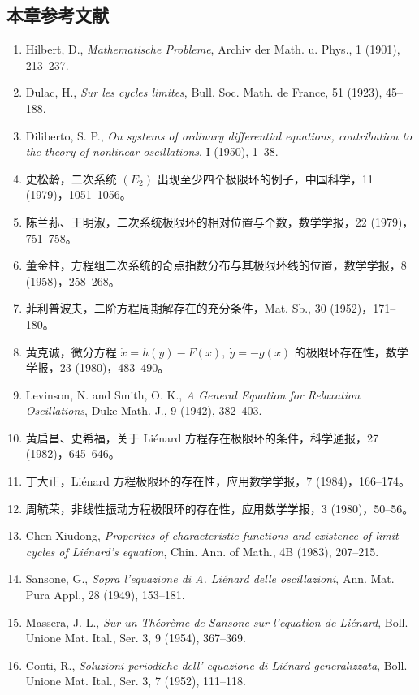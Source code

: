 \subsection*{本章参考文献}
\begin{enumerate}
\item Hilbert, D., \emph{Mathematische Probleme}, Archiv der Math. u. Phys., 1 (1901), 213--237.
\item Dulac, H., \emph{Sur les cycles limites}, Bull. Soc. Math. de France, 51 (1923), 45--188.
\item Diliberto, S. P., \emph{On systems of ordinary differential equations, contribution to the theory of nonlinear oscillations}, I (1950), 1--38.
\item 史松龄，二次系统 $(E_2)$ 出现至少四个极限环的例子，中国科学，11 (1979)，1051--1056。
\item 陈兰荪、王明淑，二次系统极限环的相对位置与个数，数学学报，22 (1979)，751--758。
\item 董金柱，方程组二次系统的奇点指数分布与其极限环线的位置，数学学报，8 (1958)，258--268。
\item 菲利普波夫，二阶方程周期解存在的充分条件，Mat. Sb., 30 (1952)，171--180。
\item 黄克诚，微分方程 $\dot x=h(y)-F(x),\ \dot y=-g(x)$ 的极限环存在性，数学学报，23 (1980)，483--490。
\item Levinson, N. and Smith, O. K., \emph{A General Equation for Relaxation Oscillations}, Duke Math. J., 9 (1942), 382--403.
\item 黄启昌、史希福，关于 Liénard 方程存在极限环的条件，科学通报，27 (1982)，645--646。
\item 丁大正，Liénard 方程极限环的存在性，应用数学学报，7 (1984)，166--174。
\item 周毓荣，非线性振动方程极限环的存在性，应用数学学报，3 (1980)，50--56。
\item Chen Xiudong, \emph{Properties of characteristic functions and existence of limit cycles of Liénard's equation}, Chin. Ann. of Math., 4B (1983), 207--215.
\item Sansone, G., \emph{Sopra l'equazione di A. Liénard delle oscillazioni}, Ann. Mat. Pura Appl., 28 (1949), 153--181.
\item Massera, J. L., \emph{Sur un Théorème de Sansone sur l'equation de Liénard}, Boll. Unione Mat. Ital., Ser. 3, 9 (1954), 367--369.
\item Conti, R., \emph{Soluzioni periodiche dell' equazione di Liénard generalizzata}, Boll. Unione Mat. Ital., Ser. 3, 7 (1952), 111--118.

\end{enumerate}
